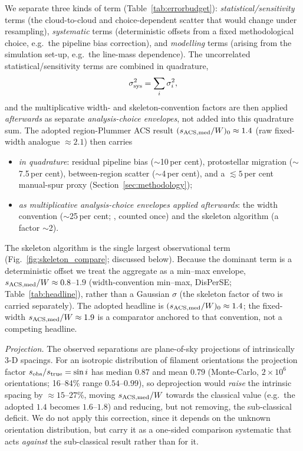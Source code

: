\documentclass[usenatbib,twoside,twocolumn]{mnras}
\begin{document}
We separate three kinds of term (Table~\ref{tab:errorbudget}): \emph{statistical/sensitivity} terms (the cloud-to-cloud and choice-dependent scatter that would change under resampling), \emph{systematic} terms (deterministic offsets from a fixed methodological choice, e.g.\ the pipeline bias correction), and \emph{modelling} terms (arising from the simulation set-up, e.g.\ the line-mass dependence). The uncorrelated statistical/sensitivity terms are combined in quadrature,
\begin{equation}
\sigma_{\rm sys}^2=\sum_i\sigma_i^2,
\label{eq:quadrature}
\end{equation}
and the multiplicative width- and skeleton-convention factors are then applied \emph{afterwards} as separate \emph{analysis-choice envelopes}, not added into this quadrature sum. The adopted region-Plummer ACS result $(s_{\rm ACS,med}/W)_0\approx1.4$ (raw fixed-width analogue $\approx2.1$) then carries
\begin{itemize}
\setlength{\itemsep}{0pt}
\item \emph{in quadrature}: residual pipeline bias ($\sim$10\,per cent), protostellar migration ($\sim$7.5\,per cent), between-region scatter ($\sim$4\,per cent), and a $\lesssim5$\,per cent manual-spur proxy (Section~\ref{sec:methodology});
\item \emph{as multiplicative analysis-choice envelopes applied afterwards}: the width convention ($\sim$25\,per cent; \citealt{Panopoulou2022}, counted once) and the skeleton algorithm (a factor $\sim$2).
\end{itemize} The skeleton algorithm is the single largest observational term (Fig.~\ref{fig:skeleton_compare}; discussed below). Because the dominant term is a deterministic offset we treat the aggregate as a min--max envelope, $s_{\rm ACS,med}/W\approx0.8$--$1.9$ (width-convention min--max, DisPerSE; Table~\ref{tab:headline}), rather than a Gaussian $\sigma$ (the skeleton factor of two is carried separately). The adopted headline is $(s_{\rm ACS,med}/W)_0\approx1.4$; the fixed-width $s_{\rm ACS,med}/W\approx1.9$ is a comparator anchored to that convention, not a competing headline.

\emph{Projection.} The observed separations are plane-of-sky projections of intrinsically 3-D spacings. For an isotropic distribution of filament orientations the projection factor $s_{\rm obs}/s_{\rm true}=\sin i$ has median $0.87$ and mean $0.79$ (Monte-Carlo, $2\times10^6$ orientations; 16--84\% range $0.54$--$0.99$), so deprojection would \emph{raise} the intrinsic spacing by $\approx15$--$27\%$, moving $s_{\rm ACS,med}/W$ towards the classical value (e.g.\ the adopted $1.4$ becomes $1.6$--$1.8$) and reducing, but not removing, the sub-classical deficit. We do not apply this correction, since it depends on the unknown orientation distribution, but carry it as a one-sided comparison systematic that acts \emph{against} the sub-classical result rather than for it.
\end{document}
